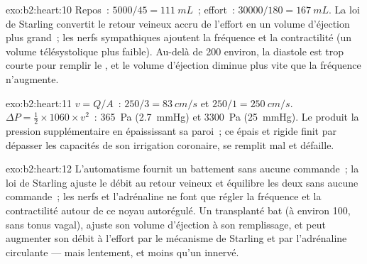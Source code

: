 \begin{solution}{exo:b2:heart:10}
Repos~: $5000/45 = \qty{111}{mL}$~; effort~: $\num{30000}/180 =
\qty{167}{mL}$. La loi de Starling convertit le retour veineux accru de
l'effort en un volume d'éjection plus grand~; les nerfs sympathiques
ajoutent la fréquence et la contractilité (un volume télésystolique plus
faible). Au-delà de 200 environ, la diastole est trop courte pour remplir
le , et le volume d'éjection diminue plus vite que la fréquence
n'augmente.
\end{solution}

\begin{solution}{exo:b2:heart:11}
$v = Q/A$~: $250/3 = \qty{83}{cm/s}$ et $250/1 = \qty{250}{cm/s}$.
$\Delta P = \tfrac12\times 1060\times v^{2}$~: \qty{365}{Pa}
(\qty{2.7}{mmHg}) et \qty{3300}{Pa} (\qty{25}{mmHg}). Le 
produit la pression supplémentaire en épaississant sa paroi~; ce
 épais et rigide finit par dépasser les capacités de son
irrigation coronaire, se remplit mal et défaille.
\end{solution}

\begin{solution}{exo:b2:heart:12}
L'automatisme fournit un battement sans aucune commande~; la loi de
Starling ajuste le débit au retour veineux et équilibre les deux
 sans aucune commande~; les nerfs et l'adrénaline ne font que
régler la fréquence et la contractilité autour de ce noyau autorégulé.
Un  transplanté bat (à environ 100, sans tonus vagal), ajuste son
volume d'éjection à son remplissage, et peut augmenter son débit à
l'effort par le mécanisme de Starling et par l'adrénaline circulante ---
mais lentement, et moins qu'un  innervé.
\end{solution}


